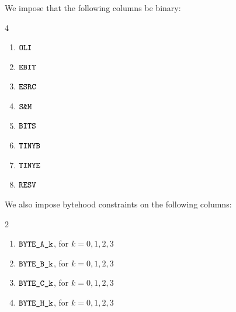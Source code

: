 We impose that the following columns be binary:
\begin{multicols}{4}
\begin{enumerate}
	\item $\texttt{OLI}{}$
	\item $\texttt{EBIT}{}$
	\item $\texttt{ESRC}{}$
	\item $\texttt{S\&M}{}$
	\item $\texttt{BITS}{}$
	\item $\texttt{TINYB}{}$
	\item $\texttt{TINYE}{}$
	\item $\texttt{RESV}{}$
\end{enumerate}
\end{multicols}
\noindent We also impose bytehood constraints on the following columns:
\begin{multicols}{2}
\begin{enumerate}
	\item $\texttt{BYTE}\texttt{\_A\_k}$, for $k=0,1,2,3$
	\item $\texttt{BYTE}\texttt{\_B\_k}$, for $k=0,1,2,3$
	\item $\texttt{BYTE}\texttt{\_C\_k}$, for $k=0,1,2,3$
	\item $\texttt{BYTE}\texttt{\_H\_k}$, for $k=0,1,2,3$
\end{enumerate}
\end{multicols}
